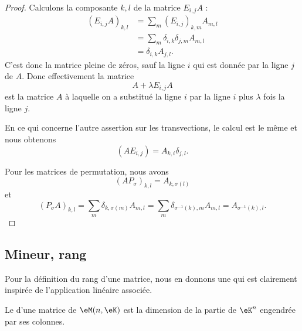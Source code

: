\begin{proof}
	Calculons la composante \( k,l\) de la matrice \( E_{i,j}A\) :
	\begin{subequations}
		\begin{align}
			(E_{i,j}A)_{k,l}  & =\sum_m(E_{i,j})_{k,m}A_{m,l}                   \\
			                  & =\sum_m\delta_{i,k}\delta_{j,m}A_{m,l}          \\
			                  & =\delta_{i,k}A_{j,l}.
		\end{align}
	\end{subequations}
	C'est donc la matrice pleine de zéros, sauf la ligne \( i\) qui est donnée par la ligne \( j\) de \( A\). Donc effectivement la matrice
	\begin{equation}
		A+\lambda E_{i,j}A
	\end{equation}
	est la matrice \( A\) à laquelle on a substitué la ligne \( i\) par la ligne \( i\) plus \( \lambda\) fois la ligne \( j\).

	En ce qui concerne l'autre assertion sur les transvections, le calcul est le même et nous obtenons
	\begin{equation}
		(AE_{i,j})=A_{k,i}\delta_{j,l}.
	\end{equation}

	Pour les matrices de permutation, nous avons
	\begin{equation}
		(AP_{\sigma})_{k,l}=A_{k,\sigma(l)}
	\end{equation}
	et
	\begin{equation}
		(P_{\sigma}A)_{k,l}=\sum_m\delta_{k,\sigma(m)}A_{m,l}=\sum_m\delta_{\sigma^{-1}(k),m}A_{m,l}=A_{\sigma^{-1}(k),l}.
	\end{equation}
\end{proof}

\subsection{Mineur, rang}

Pour la définition du rang d'une matrice, nous en donnons une qui est clairement inspirée de l'application linéaire associée.
\begin{definition}         \label{DEFooCSGXooFRzLRj}
	Le  d'une matrice de \( \eM(n,\eK)\) est la dimension de la partie de \( \eK^n\) engendrée par ses colonnes.
\end{definition}

